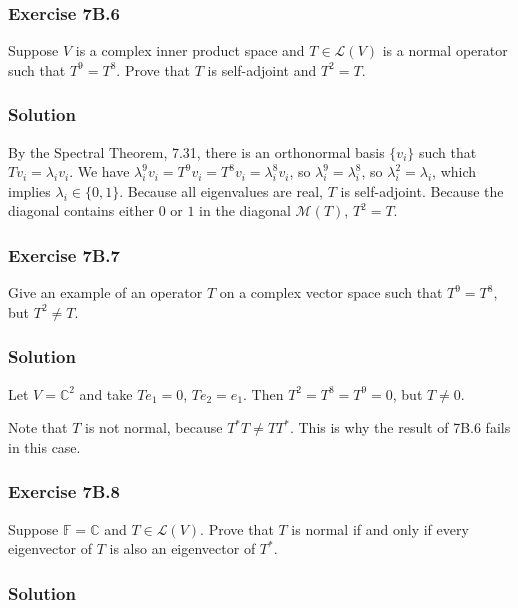 \subsubsection*{Exercise 7B.6}

Suppose $V$ is a complex inner product space and $T \in \mathcal{L}(V)$ is a normal operator such that $T^9 = T^8$.
Prove that $T$ is self-adjoint and $T^2 = T$.

\subsubsection*{Solution}

By the Spectral Theorem, 7.31, there is an orthonormal basis $\{v_i\}$ such that $Tv_i = \lambda_i v_i$.
We have $\lambda_i^9 v_i = T^9 v_i = T^8 v_i = \lambda_i^8 v_i$, so $\lambda_i^9 = \lambda_i^8$, so $\lambda_i^2 = \lambda_i$, which implies $\lambda_i \in \{0, 1\}$.
Because all eigenvalues are real, $T$ is self-adjoint.
Because the diagonal contains either $0$ or $1$ in the diagonal $\mathcal{M}(T)$, $T^2 = T$.


\subsubsection*{Exercise 7B.7}

Give an example of an operator $T$ on a complex vector space such that $T^9 = T^8$, but $T^2 \neq T$.

\subsubsection*{Solution}

Let $V = \mathbb{C}^2$ and take $Te_1 = 0$, $Te_2 = e_1$.
Then $T^2 = T^8 = T^9 = 0$, but $T \neq 0$.

Note that $T$ is not normal, because $T^*T \neq TT^*$.
This is why the result of 7B.6 fails in this case.


\subsubsection*{Exercise 7B.8}

Suppose $\mathbb{F} = \mathbb{C}$ and $T \in \mathcal{L}(V)$.
Prove that $T$ is normal if and only if every eigenvector of $T$ is also an eigenvector of $T^*$.

\subsubsection*{Solution}


